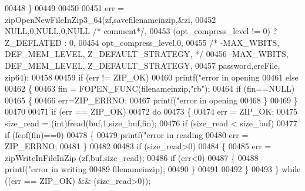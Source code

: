 \begin{DoxyCode}
{{{{{{{00448                  \}
00449 
00450                  
00451                 err = zipOpenNewFileInZip3\_64(zf,savefilenameinzip,&zi,
00452                                  NULL,0,NULL,0,NULL \textcolor{comment}{/* comment*/},
00453                                  (opt\_compress\_level != 0) ? Z\_DEFLATED : 0,
00454                                  opt\_compress\_level,0,
00455                                  \textcolor{comment}{/* -MAX\_WBITS, DEF\_MEM\_LEVEL, Z\_DEFAULT\_STRATEGY, */}
00456                                  -MAX\_WBITS, DEF\_MEM\_LEVEL, Z\_DEFAULT\_STRATEGY,
00457                                  password,crcFile, zip64);
00458 
00459                 \textcolor{keywordflow}{if} (err != ZIP\_OK)
00460                     printf(\textcolor{stringliteral}{"error in opening %
00461                 \textcolor{keywordflow}{else}
00462                 \{
00463                     fin = FOPEN\_FUNC(filenameinzip,\textcolor{stringliteral}{"rb"});
00464                     \textcolor{keywordflow}{if} (fin==NULL)
00465                     \{
00466                         err=ZIP\_ERRNO;
00467                         printf(\textcolor{stringliteral}{"error in opening %
00468                     \}
00469                 \}
00470 
00471                 \textcolor{keywordflow}{if} (err == ZIP\_OK)
00472                     \textcolor{keywordflow}{do}
00473                     \{
00474                         err = ZIP\_OK;
00475                         size\_read = (int)fread(buf,1,size\_buf,fin);
00476                         \textcolor{keywordflow}{if} (size\_read < size\_buf)
00477                             \textcolor{keywordflow}{if} (feof(fin)==0)
00478                         \{
00479                             printf(\textcolor{stringliteral}{"error in reading %
00480                             err = ZIP\_ERRNO;
00481                         \}
00482 
00483                         \textcolor{keywordflow}{if} (size\_read>0)
00484                         \{
00485                             err = zipWriteInFileInZip (zf,buf,size\_read);
00486                             \textcolor{keywordflow}{if} (err<0)
00487                             \{
00488                                 printf(\textcolor{stringliteral}{"error in writing %
00489                                                  filenameinzip);
00490                             \}
00491 
00492                         \}
00493                     \} \textcolor{keywordflow}{while} ((err == ZIP\_OK) && (size\_read>0));
}}}}}}}}}}}
\end{DoxyCode}
